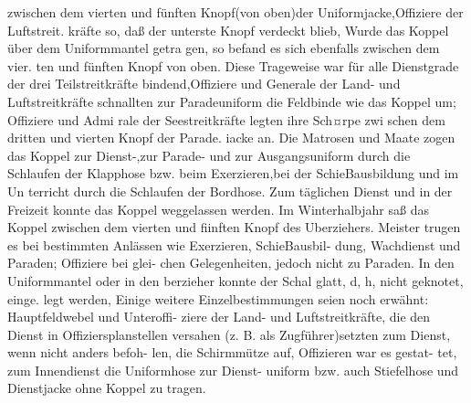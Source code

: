 zwischen dem vierten und fünften Knopf(von
oben)der Uniformjacke,Offiziere der Luftstreit.
kräfte so, daß der unterste Knopf verdeckt blieb,
Wurde das Koppel über dem Uniformmantel getra
gen, so befand es sich ebenfalls zwischen dem vier.
ten und fünften Knopf von oben. Diese Trageweise
war für alle Dienstgrade der drei Teilstreitkräfte
bindend,Offiziere und Generale der Land- und
Luftstreitkräfte schnallten zur Paradeuniform die
Feldbinde wie das Koppel um; Offiziere und Admi
rale der Seestreitkräfte legten ihre Sch¤rpe zwi
schen dem dritten und vierten Knopf der Parade.
iacke an.
Die Matrosen und Maate zogen das Koppel zur
Dienst-,zur Parade- und zur Ausgangsuniform
durch die Schlaufen der Klapphose bzw. beim
Exerzieren,bei der SchieBausbildung und im Un
terricht durch die Schlaufen der Bordhose. Zum
täglichen Dienst und in der Freizeit konnte das
Koppel weggelassen werden. Im Winterhalbjahr saß
das Koppel zwischen dem vierten und fiinften
Knopf des Uberziehers. Meister trugen es bei bestimmten Anlässen wie Exerzieren, SchieBausbil-
dung, Wachdienst und Paraden; Offiziere bei glei-
chen Gelegenheiten, jedoch nicht zu Paraden.
In den Uniformmantel oder in den berzieher
konnte der Schal glatt, d, h, nicht geknotet, einge.
legt werden, Einige weitere Einzelbestimmungen
seien noch erwähnt: Hauptfeldwebel und Unteroffi-
ziere der Land- und Luftstreitkräfte, die den Dienst
in Offiziersplanstellen versahen (z. B. als Zugführer)setzten zum Dienst, wenn nicht anders befoh-
len, die Schirmmütze auf, Offizieren war es gestat-
tet, zum Innendienst die Uniformhose zur Dienst-
uniform bzw. auch Stiefelhose und Dienstjacke
ohne Koppel zu tragen.